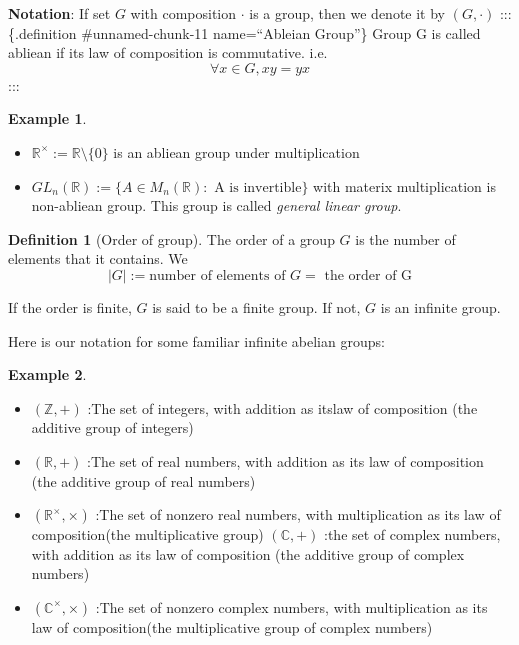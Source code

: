 \documentclass[
]{book}
\providecommand{\tightlist}{%
  \setlength{\itemsep}{0pt}\setlength{\parskip}{0pt}}
\theoremstyle{definition}
\newtheorem{definition}{Definition}[chapter]
\theoremstyle{definition}
\newtheorem{example}{Example}[chapter]
\theoremstyle{definition}
\theoremstyle{definition}
\theoremstyle{remark}
\begin{document}
\textbf{Notation}: If set \(G\) with composition \(\cdot\) is a group, then we denote it by \((G,\cdot)\)
::: \{.definition \#unnamed-chunk-11 name=``Ableian Group''\}
Group G is called abliean if its law of composition is commutative. i.e.
\[\forall x\in G, xy=yx\]
:::

\begin{example}
\protect\hypertarget{exm:unnamed-chunk-12}{}\label{exm:unnamed-chunk-12}\leavevmode

\begin{itemize}
\tightlist
\item
  \(\mathbb{R}^\times:=\mathbb{R}\setminus \{0\}\) is an abliean group under multiplication
\item
  \(GL_n(\mathbb{R}):=\{A\in M_n(\mathbb{R}): \text{ A is invertible}\}\) with materix multiplication is non-abliean group. This group is called \emph{general linear group}.
\end{itemize}

\end{example}

\begin{definition}[Order of group]
\protect\hypertarget{def:unnamed-chunk-13}{}\label{def:unnamed-chunk-13}The order of a group \(G\) is the number of elements that it contains. We \[| G | := \text{number of elements of }G=\text{ the order of G}\]

If the order is finite, \(G\) is said to be a finite group. If not, \(G\) is an infinite group.
\end{definition}

Here is our notation for some familiar infinite abelian groups:

\begin{example}
\protect\hypertarget{exm:unnamed-chunk-14}{}\label{exm:unnamed-chunk-14}\leavevmode

\begin{itemize}
\tightlist
\item
  \((\mathbb{Z},+)\) :The set of integers, with addition as itslaw of composition (the additive group of integers)
\item
  \((\mathbb{R},+)\) :The set of real numbers, with addition as its law of
  composition (the additive group of real numbers)
\item
  \((\mathbb{R}^\times,\times)\) :The set of nonzero real numbers, with multiplication as its law of composition(the multiplicative group)
  \((\mathbb{C},+)\) :the set of complex numbers, with addition as its law of composition (the additive group of complex numbers)
\item
  \((\mathbb{C}^\times,\times)\) :The set of nonzero complex numbers, with multiplication as its law of composition(the multiplicative group of complex numbers)
\end{itemize}

\end{example}
\end{document}
